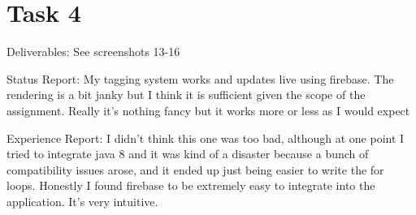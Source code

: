 \documentclass{article}
\begin{document}
\section{Task 4}
Deliverables: See screenshots 13-16

Status Report: My tagging system works and updates live using firebase. The rendering is a bit janky but I think it is sufficient given the scope of the assignment. Really it's nothing fancy but it works more or less as I would expect

Experience Report: I didn't think this one was too bad, although at one point I tried to integrate java 8 and it was kind of a disaster because a bunch of compatibility issues arose, and it ended up just being easier to write the for loops. Honestly I found firebase to be extremely easy to integrate into the application. It's very intuitive.
\end{document}
